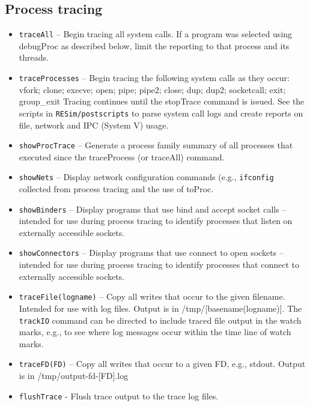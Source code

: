 \documentclass[titlepage]{article}
\begin{document}
\subsection{Process tracing}
\label{process_tracing}
\begin{itemize}
\item {\tt traceAll} – Begin tracing all system calls.  If a program was selected using debugProc as described below, limit the reporting to that process and its threads.  
\item {\tt traceProcesses} – Begin tracing the following system calls as they occur:
vfork; clone; execve;  open; pipe; pipe2; close; dup; dup2; socketcall; exit; group\_exit
Tracing continues until the stopTrace command is issued.  
See the scripts in {\tt RESim/postscripts} to parse system call logs and create reports on file, network and IPC (System V) usage.

\item {\tt showProcTrace} – Generate a process family summary of all processes that executed since the traceProcess (or traceAll) command.

\item {\tt showNets} – Display network configuration commands (e.g., {\tt ifconfig} collected from process tracing and the use of toProc.

\item {\tt showBinders} – Display programs that use bind and accept socket calls – intended for use during process tracing to identify processes that listen on externally accessible sockets.

\item {\tt showConnectors} – Display programs that use connect to open sockets – intended for use during process tracing to identify processes that connect to externally accessible sockets.

\item {\tt traceFile(logname)} – Copy all writes that occur to the given filename.  Intended for use with log files.  Output is in /tmp/[basename(logname)].
The {\tt trackIO} command can be directed to include traced file output in the watch marks, e.g., to see where log messages occur within the
time line of watch marks.

\item {\tt traceFD(FD)} – Copy all writes that occur to a given FD, e.g., stdout.  Output is in /tmp/output-fd-[FD].log  

\item {\tt flushTrace} - Flush trace output to the trace log files.


\end{itemize}
\end{document}

